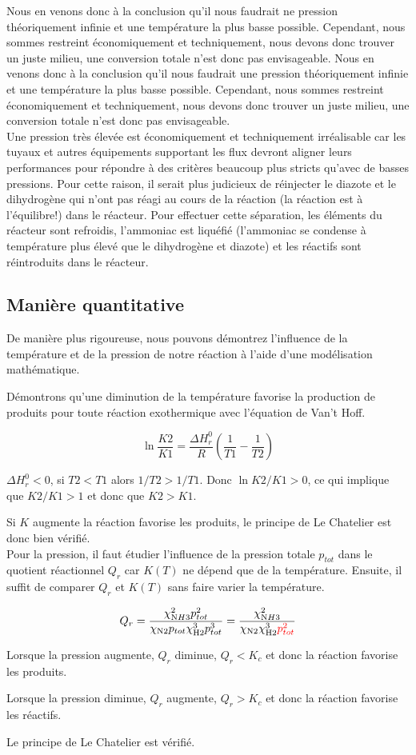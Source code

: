 \documentclass[10pt,a4paper]{article}
\begin{document}
Nous en venons donc à la conclusion qu'il nous faudrait ne pression théoriquement infinie et une température la plus basse possible. Cependant, nous sommes restreint économiquement et techniquement, nous devons donc trouver un juste milieu, une conversion totale n'est donc pas envisageable. 
Nous en venons donc à la conclusion qu'il nous faudrait une pression théoriquement infinie et une température la plus basse possible. Cependant, nous sommes restreint économiquement et techniquement, nous devons donc trouver un juste milieu, une conversion totale n'est donc pas envisageable. 
\\

Une pression très élevée est économiquement et techniquement irréalisable car les tuyaux et autres équipements supportant les flux devront aligner leurs performances pour répondre à des critères beaucoup plus stricts qu'avec de basses pressions.
Pour cette raison, il serait plus judicieux de réinjecter  le diazote et le dihydrogène qui n'ont pas réagi au cours de la réaction (la réaction est à l'équilibre!) dans le réacteur. Pour effectuer cette séparation, les éléments du réacteur sont refroidis, l'ammoniac est liquéfié (l'ammoniac se condense à température plus élevé que le dihydrogène et diazote) et les réactifs sont réintroduits dans le réacteur.

\subsection{Manière quantitative}

De manière plus rigoureuse, nous pouvons démontrez l'influence de la température et de la pression de notre réaction à l'aide d'une modélisation mathématique.

Démontrons qu'une diminution de la température favorise la production de produits pour toute réaction exothermique avec l'équation de Van't Hoff.

$$\ln{\frac{K2}{K1}} = \frac{\Delta H^0_r}{R}(\frac{1}{T1} - \frac{1}{T2}) $$ 

$ \Delta H^0_r < 0$, si $T2<T1$ alors $1/T2 > 1/T1$. Donc $\ln{K2/K1} > 0$, ce qui implique que $K2/K1>1$  et donc que $ K2>K1$.

Si $K$ augmente la réaction favorise les produits, le principe de Le Chatelier est donc bien vérifié.
\\

Pour la pression, il faut étudier l'influence de la pression totale $p_{tot}$ dans le quotient réactionnel $Q_r$ car $K(T)$ ne dépend que de la température. Ensuite, il suffit de comparer $Q_r$ et  $K(T)$ sans faire varier la température. 

$$ Q_r= \frac{\chi_{\ce NH3}^2 p_{tot}^2}{\chi_{\ce N2} p_{tot} \chi_{\ce H2}^3 p_{tot}^3}=\frac{\chi_{\ce NH3}^2}{\chi_{\ce N2} \chi_{\ce H2}^3 \textcolor{red}{p_{tot}^2}}$$ 

Lorsque la pression augmente, $Q_r$ diminue, $Q_r < K_c$ et donc la réaction favorise les produits.
 
Lorsque la pression diminue, $Q_r$ augmente, $Q_r > K_c$ et donc la réaction favorise les réactifs.

Le principe de Le Chatelier est vérifié.


 
\end{document}

